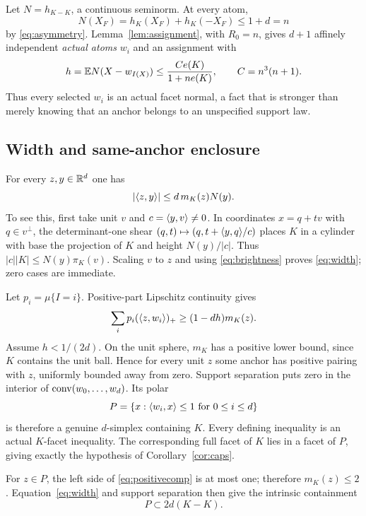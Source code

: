 Let $N=h_{K-K}$, a continuous seminorm. At every atom,
\[
 N(X_F)=h_K(X_F)+h_K(-X_F)\le1+d=n
\]
by \eqref{eq:asymmetry}. Lemma~\ref{lem:assignment}, with $R_0=n$, gives
$d+1$ affinely independent \emph{actual atoms} $w_i$ and an assignment with
\begin{equation}\label{eq:hbudget}
 h=\mathbb E N(X-w_{I(X)})\le
 \frac{Ce(K)}{1+ne(K)},\qquad C=n^3(n+1).
\end{equation}
Thus every selected $w_i$ is an actual facet normal, a fact that is stronger
than merely knowing that an anchor belongs to an unspecified support law.

\subsection{Width and same-anchor enclosure}
For every $z,y\in\mathbb R^d$ one has
\begin{equation}\label{eq:width}
 |\langle z,y\rangle|\le d\,m_K(z)N(y).
\end{equation}
To see this, first take unit $v$ and $c=\langle y,v\rangle\ne0$. In coordinates
$x=q+tv$ with $q\in v^\perp$, the determinant-one shear
$(q,t)\mapsto(q,t+\langle y,q\rangle/c)$ places $K$ in a cylinder with base the
projection of $K$ and height $N(y)/|c|$. Thus
$|c||K|\le N(y)\pi_K(v)$. Scaling $v$ to $z$ and using
\eqref{eq:brightness} proves \eqref{eq:width}; zero cases are immediate.

Let $p_i=\mu\{I=i\}$. Positive-part Lipschitz continuity gives
\begin{equation}\label{eq:positivecomp}
 \sum_i p_i(\langle z,w_i\rangle)_+\ge(1-dh)m_K(z).
\end{equation}
Assume $h<1/(2d)$. On the unit sphere, $m_K$ has a positive lower bound,
since $K$ contains the unit ball. Hence for every unit $z$ some anchor has
positive pairing with $z$, uniformly bounded away from zero. Support
separation puts zero in the interior of $\operatorname{conv}(w_0,\ldots,w_d)$.
Its polar
\begin{equation}\label{eq:outer}
 P=\{x:\langle w_i,x\rangle\le1\text{ for }0\le i\le d\}
\end{equation}
is therefore a genuine $d$-simplex containing $K$. Every defining
inequality is an actual $K$-facet inequality. The corresponding full facet
of $K$ lies in a facet of $P$, giving exactly the hypothesis of
Corollary~\ref{cor:caps}.

For $z\in P$, the left side of \eqref{eq:positivecomp} is at most one;
therefore $m_K(z)\le2$. Equation~\eqref{eq:width} and support separation
then give the intrinsic containment
\begin{equation}\label{eq:intrinsiccontain}
 P\subset2d(K-K).
\end{equation}

